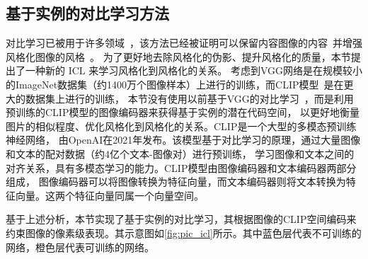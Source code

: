 \subsection{基于实例的对比学习方法}
对比学习已被用于许多领域~\cite{chen2020improved,han2021dual,wu2021contrastive}，该方法已经被证明可以保留内容图像的内容~\cite{han2021dual}并增强风格化图像的风格~\cite{chen2021artistic}。
为了更好地去除风格化的伪影、提升风格化的质量，本节提出了一种新的 ICL 来学习风格化到风格化的关系。
考虑到VGG网络是在规模较小的ImageNet数据集（约1400万个图像样本）上进行的训练，而CLIP模型~\cite{radford2021learning}是在更大的数据集上进行的训练，
本节没有使用以前基于VGG的对比学习~\cite{han2021dual}，而是利用预训练的CLIP模型的图像编码器来获得基于实例的潜在代码空间，
以更好地衡量图片的相似程度、优化风格化到风格化的关系。CLIP是一个大型的多模态预训练神经网络，
由OpenAI在2021年发布。‌该模型基于对比学习的原理，通过大量图像和文本的配对数据（约4亿个文本-图像对）进行预训练，
学习图像和文本之间的对齐关系，具有多模态学习的能力。CLIP模型由图像编码器和文本编码器两部分组成，
图像编码器可以将图像转换为特征向量，而文本编码器则将文本转换为特征向量。这两个特征向量同属一个向量空间。

\par 基于上述分析，本节实现了基于实例的对比学习，其根据图像的CLIP空间编码来约束图像的像素级表现。其示意图如\autoref{fig:pic_icl}所示。其中蓝色层代表不可训练的网络，橙色层代表可训练的网络。

